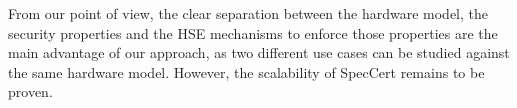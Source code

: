 From our point of view, the clear separation between the hardware model, the
security properties and the HSE mechanisms to enforce those properties are the
main advantage of our approach, as two different use cases can be studied
against the same hardware model. However, the scalability of SpecCert remains to
be proven.
